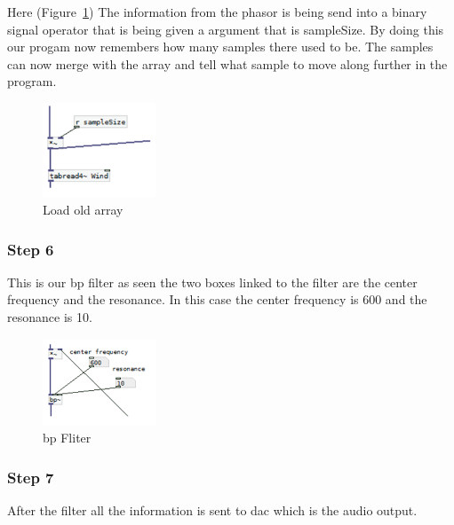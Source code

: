 Here (Figure~\ref{fig:implementation7}) 
The information from the phasor is being send into a binary signal operator that is being given a argument that is sampleSize. By doing this our progam now remembers how many samples there used to be. The samples can now merge with the array and tell what sample to move along further in the program.

\begin{figure}[!htbp]
    \centering
    \includegraphics[width=0.3\textwidth]{images/Implementation7.png}
    \caption{Load old array}
    \label{fig:implementation7}
\end{figure}



\subsubsection*{Step 6} %
\label{ssub:step_6}

This is our bp filter as seen the two boxes linked to the filter are the center frequency and the resonance. 
In this case the center frequency is 600 and the resonance is 10.

\begin{figure}[!htbp]
    \centering
    \includegraphics[width=0.3\textwidth]{images/Implementation8.png}
    \caption{bp Fliter}
    \label{fig:implementation8}
\end{figure}


\FloatBarrier
\subsubsection*{Step 7} %
\label{ssub:step_7}

After the filter all the information is sent to dac which is the audio output.

